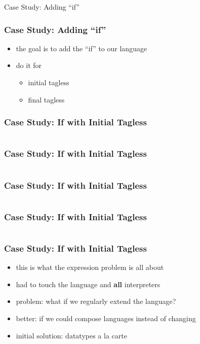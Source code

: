 \documentclass[aspectratio=169, hyperref={colorlinks, linkcolor=beamer@centricgreen}, urlcolor=links]{beamer}
\begin{document}
\begin{frame}
  \begin{center}
    \Huge
    Case Study: Adding ``if''
  \end{center}
\end{frame}

\begin{frame}
  \frametitle{Case Study: Adding ``if''}
  \begin{itemize}
  \item the goal is to add the ``if'' to our language
  \item do it for
    \begin{itemize}
    \item initial tagless
    \item final tagless
    \end{itemize}
  \end{itemize}
\end{frame}

\begin{frame}[fragile]
  \frametitle{Case Study: If with Initial Tagless}
  \inputminted[fontsize=\footnotesize]{scala}{snippets/initial-tagless-expr-if.scala}
\end{frame}

\begin{frame}[fragile]
  \frametitle{Case Study: If with Initial Tagless}
  \inputminted[fontsize=\footnotesize]{scala}{snippets/initial-tagless-sample-if.scala}
\end{frame}

\begin{frame}[fragile]
  \frametitle{Case Study: If with Initial Tagless}
  \inputminted[fontsize=\footnotesize]{scala}{snippets/initial-tagless-interp-if.scala}
\end{frame}

\begin{frame}[fragile]
  \frametitle{Case Study: If with Initial Tagless}
  \inputminted[fontsize=\footnotesize]{scala}{snippets/initial-tagless-handle-if.scala}
\end{frame}

\begin{frame}
  \frametitle{Case Study: If with Initial Tagless}
  \begin{itemize}
  \item this is what the expression problem is all about
  \item had to touch the language and \textbf{all} interpreters
  \item problem: what if we regularly extend the language?
  \item better: if we could compose languages instead of changing
  \item initial solution: datatypes a la carte
  \end{itemize}
\end{frame}
\end{document}

